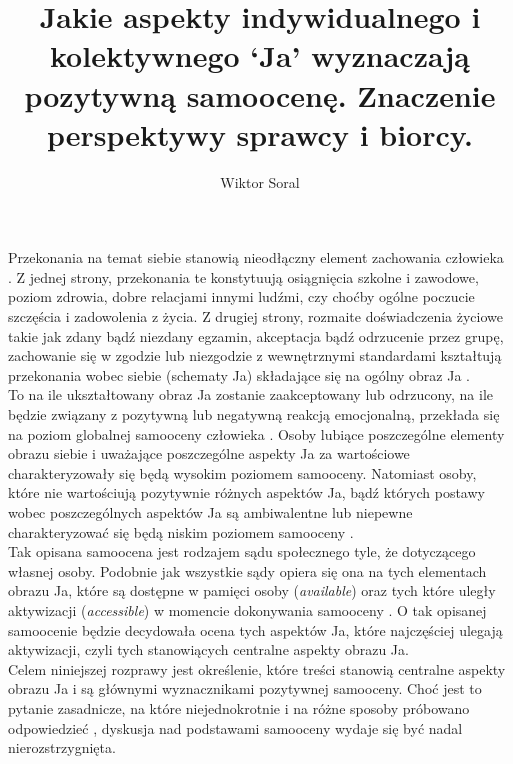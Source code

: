 \documentclass[man]{apa6}
\title{Jakie aspekty indywidualnego i kolektywnego `Ja' wyznaczają
       pozytywną samoocenę. Znaczenie perspektywy sprawcy i biorcy.}
\author{Wiktor Soral}
\affiliation{Uniwersytet Warszawski}
\begin{document}
\maketitle


Przekonania na temat siebie stanowią nieodłączny element zachowania człowieka \parencite[np.,][]{bandura1991social, deci2000and, rosenberg1965society, tesser1988toward}. Z jednej strony, przekonania te konstytuują osiągnięcia szkolne i zawodowe, poziom zdrowia, dobre relacjami innymi ludźmi, czy choćby ogólne poczucie szczęścia i zadowolenia z życia. Z drugiej strony, rozmaite doświadczenia życiowe takie jak zdany bądź niezdany egzamin, akceptacja bądź odrzucenie przez grupę, zachowanie się w zgodzie lub niezgodzie z wewnętrznymi standardami kształtują przekonania wobec siebie (schematy Ja) składające się na ogólny obraz Ja \parencite{markus1977self}. \\

To na ile ukształtowany obraz Ja zostanie zaakceptowany lub odrzucony, na ile będzie związany z pozytywną lub negatywną reakcją emocjonalną, przekłada się na poziom globalnej samooceny człowieka \parencite{brown1993self, rosenberg1965society}. Osoby lubiące poszczególne elementy obrazu siebie i uważające poszczególne aspekty Ja za wartościowe charakteryzowały się będą wysokim poziomem samooceny. Natomiast osoby, które nie wartościują pozytywnie różnych aspektów Ja, bądź których postawy wobec poszczególnych aspektów Ja są ambiwalentne lub niepewne charakteryzować się będą niskim poziomem samooceny \parencite{baumeister1989self}.\\

Tak opisana samoocena jest rodzajem sądu społecznego tyle, że dotyczącego własnej osoby. Podobnie jak wszystkie sądy opiera się ona na tych elementach obrazu Ja, które są dostępne w pamięci osoby (\emph{available}) oraz tych które uległy aktywizacji (\emph{accessible}) w momencie dokonywania samooceny \parencite[zob. np., ][]{higgins1996knowledge}. O tak opisanej samoocenie będzie decydowała ocena tych aspektów Ja, które najczęściej ulegają aktywizacji, czyli tych stanowiących centralne aspekty obrazu Ja.\\

Celem niniejszej rozprawy jest określenie, które treści stanowią centralne aspekty obrazu Ja i są głównymi wyznacznikami pozytywnej samooceny. Choć jest to pytanie zasadnicze, na które niejednokrotnie i na różne sposoby próbowano odpowiedzieć \parencite[np.,][]{brambilla2014importance, gebauer2013agency, wojciszke2011self}, dyskusja nad podstawami samooceny wydaje się być nadal nierozstrzygnięta.\\
\end{document}
